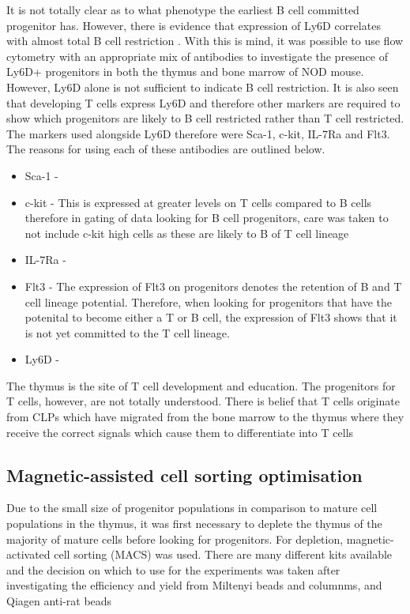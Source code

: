  It is not totally clear as to what phenotype the earliest B cell committed progenitor has. 
 However, there is evidence that expression of Ly6D correlates with almost total B cell restriction .
 With this is mind, it was possible to use flow cytometry with an appropriate mix of antibodies to investigate the presence of Ly6D+ progenitors in both the thymus and bone marrow of NOD mouse.
However, Ly6D alone is not sufficient to indicate B cell restriction. 
It is also seen that developing T cells express Ly6D and therefore other markers are required to show which progenitors are likely to B cell restricted rather than T cell restricted.
The markers used alongside Ly6D therefore were Sca-1, c-kit, IL-7Ra and Flt3. 
The reasons for using each of these antibodies are outlined below.
\begin{itemize}
\item Sca-1 - 
\item c-kit - This is expressed at greater levels on T cells compared to B cells therefore in gating of data looking for B cell progenitors, care was taken to not include c-kit high cells as these are likely to B of T cell lineage  
\item IL-7Ra - 
\item Flt3 - The expression of Flt3 on progenitors denotes the retention of B and T cell lineage potential. Therefore, when looking for progenitors that have the potenital to become either a T or B cell, the expression of Flt3 shows that it is not yet committed to the T cell lineage.
\item Ly6D - 
\end{itemize}




The thymus is the site of T cell development and education.
The progenitors for T cells, however, are not totally understood. 
There is belief that T cells originate from CLPs which have migrated from the bone marrow to the thymus where they receive the correct signals which cause them to differentiate into T cells
\subsection{Magnetic-assisted cell sorting optimisation}

Due to the small size of progenitor populations in comparison to mature cell populations in the thymus, it was first necessary to deplete the thymus of the majority of mature cells before looking for progenitors.
For depletion, magnetic-activated cell sorting (MACS) was used.
There are many different kits available and the decision on which to use for the experiments was taken after investigating the efficiency and yield from Miltenyi beads and columnms, and Qiagen anti-rat beads 

